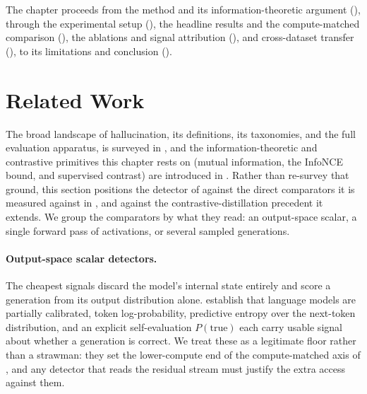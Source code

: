 The chapter proceeds from the method and its information-theoretic argument
(), through the experimental setup (), the
headline results and the compute-matched comparison
(), the ablations and signal attribution
(), and cross-dataset transfer (), to
its limitations and conclusion
().

\section{Related Work}
\label{sec:hd:related}

The broad landscape of hallucination, its definitions, its taxonomies, and the
full evaluation apparatus, is surveyed in , and the
information-theoretic and contrastive primitives this chapter rests on (mutual
information, the InfoNCE bound, and supervised contrast) are introduced in
. Rather than re-survey that ground, this section positions
the detector of  against the direct comparators it is
measured against in , and against the contrastive-distillation
precedent it extends. We group the comparators by what they read: an output-space
scalar, a single forward pass of activations, or several sampled generations.

\paragraph{Output-space scalar detectors.}
The cheapest signals discard the model's internal state entirely and score a
generation from its output distribution alone. \citet{kadavath2022language}
establish that language models are partially calibrated, token log-probability,
predictive entropy over the next-token distribution, and an explicit
self-evaluation $P(\mathrm{true})$ each carry usable signal about whether a
generation is correct. We treat these as a legitimate floor rather than a
strawman: they set the lower-compute end of the compute-matched axis of
, and any detector that reads the residual stream must
justify the extra access against them.


